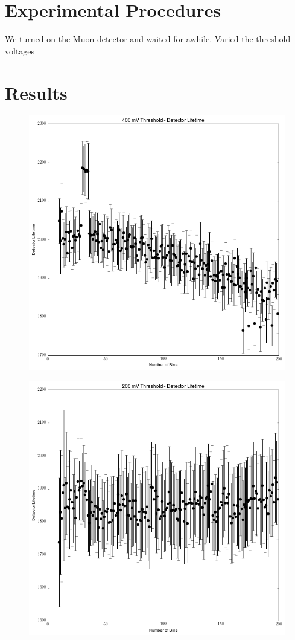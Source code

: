 \documentclass[11pt,letterpaper]{article}
\begin{document}
\section{Experimental Procedures}
We turned on the Muon detector and waited for awhile.
Varied the threshold voltages
\section{Results}
\begin{figure}[h!]
  \centering
      \includegraphics[scale=.7]{400mVDect.png}
      \caption{}
      \label{fig:400}
\end{figure}
\begin{figure}[h!]
  \centering
      \includegraphics[scale=.7]{208mVDect.png}
      \caption{}
      \label{fig:208}
\end{figure}
\end{document}

